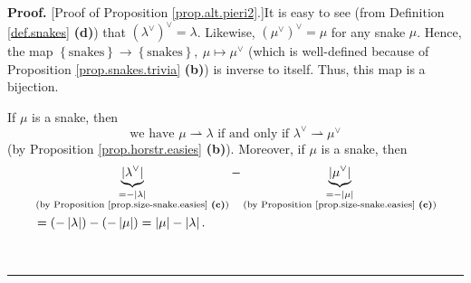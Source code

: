 \documentclass[numbers=enddot,12pt,final,onecolumn,notitlepage]{scrartcl}%
\theoremstyle{definition}
\newenvironment{proof}[1][Proof]{\noindent\textbf{#1.} }{\ \rule{0.5em}{0.5em}}
\begin{document}
\begin{proof}
[Proof of Proposition \ref{prop.alt.pieri2}.]It is easy to see (from
Definition \ref{def.snakes} \textbf{(d)}) that $\left(  \lambda^{\vee}\right)
^{\vee}=\lambda$. Likewise, $\left(  \mu^{\vee}\right)  ^{\vee}=\mu$ for any
snake $\mu$. Hence, the map $\left\{  \text{snakes}\right\}  \rightarrow
\left\{  \text{snakes}\right\}  ,\ \mu\mapsto\mu^{\vee}$ (which is
well-defined because of Proposition \ref{prop.snakes.trivia} \textbf{(b)}) is
inverse to itself. Thus, this map is a bijection.

If $\mu$ is a snake, then
\begin{equation}
\text{we have }\mu\rightharpoonup\lambda\text{ if and only if }\lambda^{\vee
}\rightharpoonup\mu^{\vee} \label{pf.prop.alt.pieri2.1}%
\end{equation}
(by Proposition \ref{prop.horstr.easies} \textbf{(b)}). Moreover, if $\mu$ is
a snake, then%
\begin{align}
&  \underbrace{\left\vert \lambda^{\vee}\right\vert }_{\substack{=-\left\vert
\lambda\right\vert \\\text{(by Proposition \ref{prop.size-snake.easies}
\textbf{(c)})}}}-\underbrace{\left\vert \mu^{\vee}\right\vert }%
_{\substack{=-\left\vert \mu\right\vert \\\text{(by Proposition
\ref{prop.size-snake.easies} \textbf{(c)})}}}\nonumber\\
&  =\left(  -\left\vert \lambda\right\vert \right)  -\left(  -\left\vert
\mu\right\vert \right)  =\left\vert \mu\right\vert -\left\vert \lambda
\right\vert . \label{pf.prop.alt.pieri2.2}%
\end{align}



\end{proof}
\end{document}

